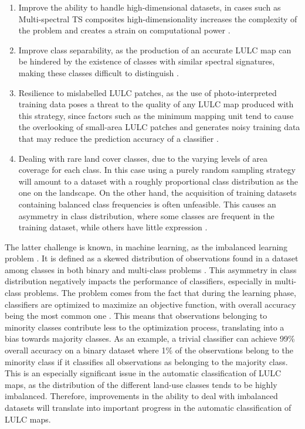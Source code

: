 \documentclass[remotesensing,article,submit,moreauthors,pdftex]{Definitions/mdpi}
\begin{document}
\begin{enumerate}
    \item Improve the ability to handle high-dimensional datasets, in cases such
        as Multi-spectral TS composites high-dimensionality increases the
        complexity of the problem and creates a strain on computational power
        \cite{Stromann2020}.
    \item Improve class separability, as the production of an accurate LULC map
        can be hindered by the existence of classes with similar spectral
        signatures, making these classes difficult to distinguish
        \cite{Alonso-Sarria2019}.
    \item Resilience to mislabelled LULC patches, as the use of
        photo-interpreted training data poses a threat to the quality of any
        LULC map produced with this strategy, since factors such as the minimum
        mapping unit tend to cause the overlooking of small-area LULC patches
        and generates noisy training data that may reduce the prediction
        accuracy of a classifier \cite{Pelletier2017}.
    \item Dealing with rare land cover classes, due to the varying levels of
        area coverage for each class. In this case using a purely random
        sampling strategy will amount to a dataset with a roughly proportional
        class distribution as the one on the landscape. On the other hand, the
        acquisition of training datasets containing balanced class frequencies
        is often unfeasible. This causes an asymmetry in class distribution,
        where some classes are frequent in the training dataset, while others
        have little expression \cite{Wang2019, Feng2019}.
\end{enumerate}

The latter challenge is known, in machine learning, as the imbalanced learning
problem \cite{Chawla2004}. It is defined as a skewed distribution of
observations found in a dataset among classes in both binary and multi-class
problems \cite{Abdi2016}. This asymmetry in class distribution negatively
impacts the performance of classifiers, especially in multi-class problems.
The problem comes from the fact that during the learning phase, classifiers
are optimized to maximize an objective function, with overall accuracy being
the most common one \cite{Maxwell2018}. This means that observations
belonging to minority classes contribute less to the optimization process,
translating into a bias towards majority classes.  As an example, a trivial
classifier can achieve 99\% overall accuracy on a binary dataset where 1\% of
the observations belong to the minority class if it classifies all
observations as belonging to the majority class. This is an especially
significant issue in the automatic classification of LULC maps, as the
distribution of the different land-use classes tends to be highly imbalanced.
Therefore, improvements in the ability to deal with imbalanced datasets will
translate into important progress in the automatic classification of LULC
maps.
\end{document}
